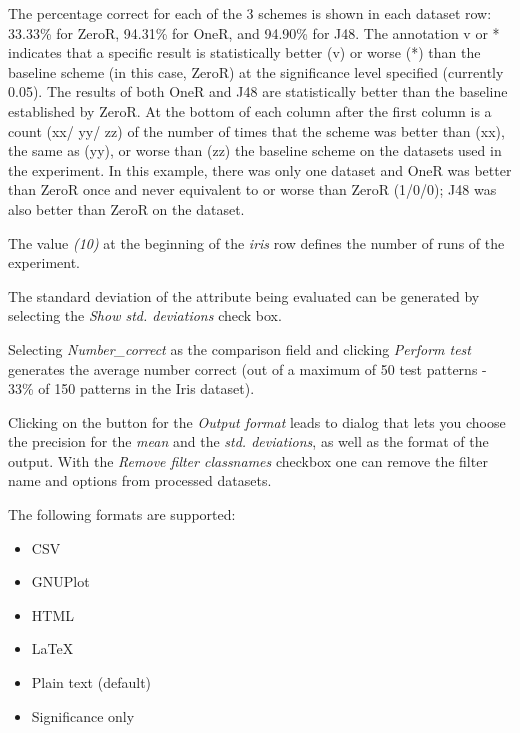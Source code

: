 \documentclass[a4paper]{article}
\begin{document}
The percentage correct for each of the 3 schemes is shown in each dataset row: 33.33\% for ZeroR, 94.31\% for OneR, and 94.90\% for J48. The annotation v or * indicates that a specific result is statistically better (v) or worse (*) than the baseline scheme (in this case, ZeroR) at the significance level specified (currently 0.05). The results of both OneR and J48 are statistically better than the baseline established by ZeroR. At the bottom of each column after the first column is a count (xx/ yy/ zz) of the number of times that the scheme was better than (xx), the same as (yy), or worse than (zz) the baseline scheme on the datasets used in the experiment. In this example, there was only one dataset and OneR was better than ZeroR once and never equivalent to or worse than ZeroR (1/0/0); J48 was also better than ZeroR on the dataset.

The value \textit{(10)} at the beginning of the \textit{iris} row defines the number of runs of the experiment.

The standard deviation of the attribute being evaluated can be generated by selecting the \textit{Show std. deviations} check box.
\begin{center}
\end{center}

Selecting \textit{Number\_correct} as the comparison field and clicking \textit{Perform test} generates the average number correct (out of a maximum of 50 test patterns - 33\% of 150 patterns in the Iris dataset).
\begin{center}
\end{center}

Clicking on the button for the \textit{Output format} leads to dialog that lets you choose the precision for the \textit{mean} and the \textit{std. deviations}, as well as the format of the output. With the \textit{Remove filter classnames} checkbox one can remove the filter name and options from processed datasets.

The following formats are supported:

\begin{itemize}
   \item CSV
   \item GNUPlot
   \item HTML
   \item LaTeX
   \item Plain text (default)
   \item Significance only 
\end{itemize}
\end{document}
